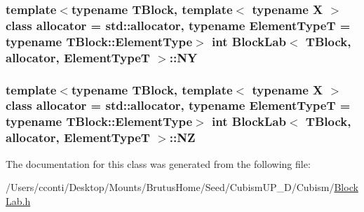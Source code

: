 \subsubsection[{N\+Y}]{\setlength{\rightskip}{0pt plus 5cm}template$<$typename T\+Block, template$<$ typename X $>$ class allocator = std\+::allocator, typename Element\+Type\+T = typename T\+Block\+::\+Element\+Type$>$ int {\bf Block\+Lab}$<$ T\+Block, allocator, Element\+Type\+T $>$\+::N\+Y\hspace{0.3cm}{\ttfamily [protected]}}\label{class_block_lab_aaa1e748664ebb6b4fc7c47cf30a445db}
\hypertarget{class_block_lab_acdd7f4e2489d31da6a2a76099807a7c5}{}
\subsubsection[{N\+Z}]{\setlength{\rightskip}{0pt plus 5cm}template$<$typename T\+Block, template$<$ typename X $>$ class allocator = std\+::allocator, typename Element\+Type\+T = typename T\+Block\+::\+Element\+Type$>$ int {\bf Block\+Lab}$<$ T\+Block, allocator, Element\+Type\+T $>$\+::N\+Z\hspace{0.3cm}{\ttfamily [protected]}}\label{class_block_lab_acdd7f4e2489d31da6a2a76099807a7c5}


The documentation for this class was generated from the following file\+:\begin{DoxyCompactItemize}
\item 
/\+Users/cconti/\+Desktop/\+Mounts/\+Brutus\+Home/\+Seed/\+Cubism\+U\+P\+\_\+D/\+Cubism/\hyperlink{_block_lab_8h}{Block\+Lab.\+h}\end{DoxyCompactItemize}
